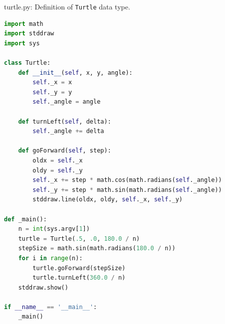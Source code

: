 \documentclass[8pt,a4paper,compress]{beamer}
\begin{document}
\begin{frame}[fragile]
\pause

\begin{framed}
\tiny turtle.py: Definition of \lstinline{Turtle} data type.
\end{framed}

\begin{lstlisting}[language=Python]
import math
import stddraw
import sys

class Turtle:
    def __init__(self, x, y, angle):
        self._x = x  
        self._y = y 
        self._angle = angle  
        
    def turnLeft(self, delta):
        self._angle += delta

    def goForward(self, step):
        oldx = self._x
        oldy = self._y
        self._x += step * math.cos(math.radians(self._angle))
        self._y += step * math.sin(math.radians(self._angle))
        stddraw.line(oldx, oldy, self._x, self._y)

def _main():
    n = int(sys.argv[1])
    turtle = Turtle(.5, .0, 180.0 / n)
    stepSize = math.sin(math.radians(180.0 / n))
    for i in range(n):
        turtle.goForward(stepSize)
        turtle.turnLeft(360.0 / n)
    stddraw.show()

if __name__ == '__main__':
    _main()
\end{lstlisting}
\end{frame}
\end{document}
